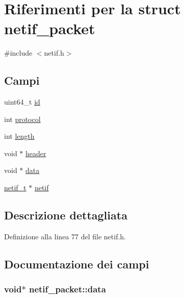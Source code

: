 \hypertarget{structnetif__packet}{\section{Riferimenti per la struct netif\+\_\+packet}
\label{structnetif__packet}
}


{\ttfamily \#include $<$netif.\+h$>$}

\subsection*{Campi}
\begin{DoxyCompactItemize}
\item 
uint64\+\_\+t \hyperlink{structnetif__packet_ac2dc39fe302e155960127c09161f36ae}{id}
\item 
int \hyperlink{structnetif__packet_a2517358f8125e0a674a0628a77f1095d}{protocol}
\item 
int \hyperlink{structnetif__packet_a244620016b7d377fd2558f5ccfc85d18}{length}
\item 
void $\ast$ \hyperlink{structnetif__packet_a3733c55855518d575eea678f5a2815e8}{header}
\item 
void $\ast$ \hyperlink{structnetif__packet_a3b4b8603d752944ba4360db33c5870b5}{data}
\item 
\hyperlink{netif_8h_af6c73b8fa12396c0382f58d63e895008}{netif\+\_\+t} $\ast$ \hyperlink{structnetif__packet_a3590a941c954bab54971940eeab55144}{netif}
\end{DoxyCompactItemize}


\subsection{Descrizione dettagliata}


Definizione alla linea 77 del file netif.\+h.



\subsection{Documentazione dei campi}
\hypertarget{structnetif__packet_a3b4b8603d752944ba4360db33c5870b5}{
\subsubsection[{data}]{\setlength{\rightskip}{0pt plus 5cm}void$\ast$ netif\+\_\+packet\+::data}}\label{structnetif__packet_a3b4b8603d752944ba4360db33c5870b5}


